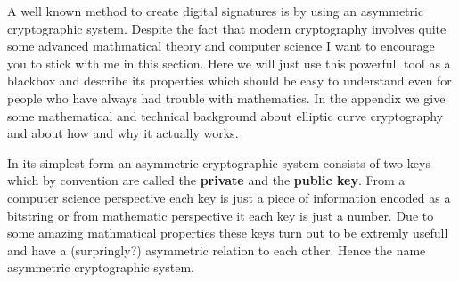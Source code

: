 \documentclass[ebook,12pt,oneside,openany]{memoir}
\begin{document}
A well known method to create digital signatures is by using an \gls{asymmetric cryptographic system}.
Despite the fact that modern cryptography involves quite some advanced mathmatical theory and computer science I want to encourage you to stick with me in this section.
Here we will just use this powerfull tool as a blackbox and describe its properties which should be easy to understand even for people who have always had trouble with mathematics.
In the appendix we give some mathematical and technical background about elliptic curve cryptography and about how and why it actually works.

In its simplest form an asymmetric cryptographic system consists of two keys which by convention are called the \textbf{private} and the \textbf{public key}.
From a computer science perspective each key is just a  piece of information encoded as a bitstring or from mathematic perspective it each key is just a number.
Due to some amazing mathmatical properties these keys turn out to be extremly usefull and have a (surpringly?) asymmetric relation to each other.
Hence the name asymmetric cryptographic system.
\end{document}
